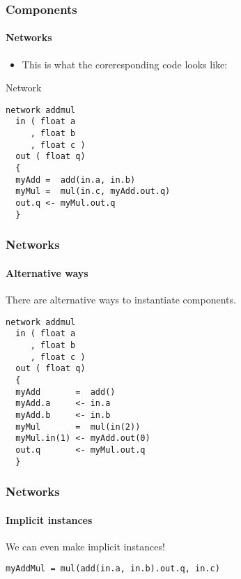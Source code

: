 \begin{frame}[fragile]
\frametitle{Components}
\framesubtitle{Networks}

\begin{itemize}\pause
\item This is what the coreresponding code looks like:
\end{itemize}

\pause

\begin{block}{Network}
\begin{verbatim}
network addmul
  in ( float a
     , float b
     , float c )
  out ( float q)
  {
  myAdd =  add(in.a, in.b)
  myMul =  mul(in.c, myAdd.out.q)
  out.q <- myMul.out.q
  }
\end{verbatim}
\end{block}
\end{frame}


\begin{frame}[fragile]
\frametitle{Networks}
\framesubtitle{Alternative ways}

There are alternative ways to instantiate components.

\pause
\begin{example}
\begin{verbatim}
network addmul
  in ( float a
     , float b
     , float c )
  out ( float q)
  {
  myAdd       =  add()
  myAdd.a     <- in.a
  myAdd.b     <- in.b
  myMul       =  mul(in(2))
  myMul.in(1) <- myAdd.out(0)
  out.q       <- myMul.out.q
  }
\end{verbatim}
\end{example}
\end{frame}


\begin{frame}[fragile]
\frametitle{Networks}
\framesubtitle{Implicit instances}

We can even make implicit instances!

\pause
\begin{example}
\verb|myAddMul = mul(add(in.a, in.b).out.q, in.c)|
\end{example}

\end{frame}


